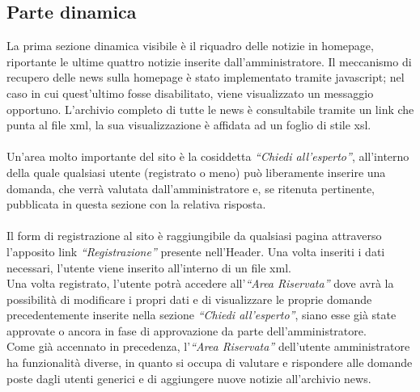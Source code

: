 \documentclass[a4paper]{article}
\begin{document}
\subsection{Parte dinamica}
La prima sezione dinamica visibile è il riquadro delle notizie in homepage, riportante le ultime quattro notizie inserite dall'amministratore. Il meccanismo di recupero delle news sulla homepage è stato implementato tramite javascript; nel caso in cui quest'ultimo fosse disabilitato, viene visualizzato un messaggio opportuno.
L'archivio completo di tutte le news è consultabile tramite un link che punta al file xml, la sua visualizzazione è affidata ad un foglio di stile xsl.\\\\
Un'area molto importante del sito è la cosiddetta \textit{``Chiedi all'esperto''}, all'interno della quale qualsiasi utente (registrato o meno) può liberamente inserire una domanda, che verrà valutata dall'amministratore e, se ritenuta pertinente, pubblicata in questa sezione con la relativa risposta.\\\\
Il form di registrazione al sito è raggiungibile da qualsiasi pagina attraverso l'apposito link \textit{``Registrazione''} presente nell'Header. Una volta inseriti i dati necessari, l'utente viene inserito all'interno di un file xml.\\
Una volta registrato, l'utente potrà accedere all'\textit{``Area Riservata''} dove avrà la possibilità di modificare i propri dati e di visualizzare le proprie domande precedentemente inserite nella sezione \textit{``Chiedi all'esperto''}, siano esse già state approvate o ancora in fase di approvazione da parte dell'amministratore.\\
Come già accennato in precedenza, l'\textit{``Area Riservata''} dell'utente amministratore ha funzionalità diverse, in quanto si occupa di valutare e rispondere alle domande poste dagli utenti generici e di aggiungere nuove notizie all'archivio news. 
\end{document}
